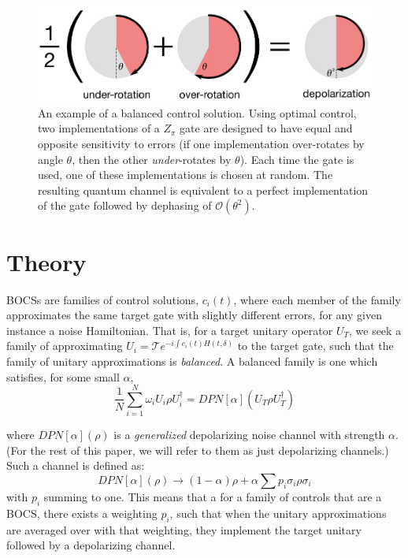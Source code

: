 \documentclass[aps,nofootinbib,pra,notitlepage,twocolumn]{revtex4-1}
\newcommand{\order}[1]{\mathcal{O}\left( #1 \right)}
\begin{document}
\begin{figure}
  \centering
  \includegraphics[width=\columnwidth]{simple_example.pdf}
  \caption{An example of a balanced control solution. Using optimal control, two implementations of a $Z_\pi$ gate are designed to have equal and opposite sensitivity to errors (if one implementation over-rotates by angle $\theta$, then the other \emph{under}-rotates by $\theta$). Each time the gate is used, one of these implementations is chosen at random. The resulting quantum channel is equivalent to a perfect implementation of the gate followed by dephasing of $\order{\theta^2}$.}
  \label{fig:simple_example}
\end{figure}

\section{Theory}
 BOCSs are families of control solutions, $c_i(t)$, where each member of the family approximates the same target gate with slightly different errors, for any given instance a noise Hamiltonian. That is, for a target unitary operator $U_T$, we seek a family of approximating $U_i = \mathcal{T}e^{-i\int c_i(t)H(t, \delta)}$ to the target gate, such that the family of unitary approximations is \emph{balanced}. A balanced family is one which satisfies, for some small $\alpha$,
\begin{equation}\label{eq:1}
  \frac{1}{N}\sum_{i=1}^N \omega_i U_i \rho U_i^\dagger = DPN[\alpha]\left(U_T \rho U_T^\dagger \right)
\end{equation}

where $DPN[\alpha](\rho)$ is a \textit{generalized} depolarizing noise channel with strength $\alpha$. (For the rest of this paper, we will refer to them as just depolarizing channels.) Such a channel is defined as:
\begin{equation}\label{eq:2}
  DPN[\alpha](\rho) \rightarrow (1-\alpha)\rho + \alpha\sum p_i \sigma_i\rho\sigma_i
\end{equation}
with $p_i$ summing to one. This means that a for a family of controls that are a BOCS, there exists a weighting $p_i$, such that when the unitary approximations are averaged over with that weighting, they implement the target unitary followed by a depolarizing channel.
\end{document}
